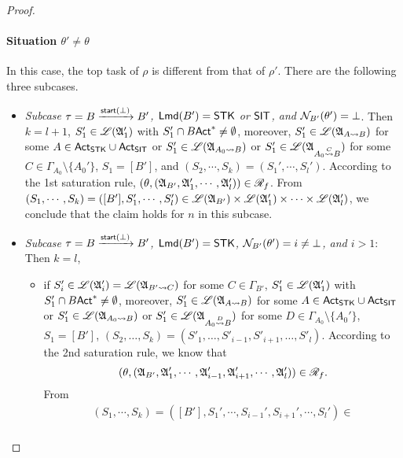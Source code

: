 \begin{proof}
{    \paragraph{Situation $\theta' \neq \theta$}
    In this case, the top task of $\rho$ is different from that of $\rho'$.  There are the following three subcases. 
    \begin{itemize}
        \item \emph{Subcase $\tau = B \xrightarrow{\startactivity(\bot)} B'$, $\lmd(B') = \STK$ or $\SIT$, and $\namefun_{B'}(\theta') = \bot$}. Then $k=l+1$, 
        $S_1'\in\Lang(\Aut_1')$ with $S_1'\cap B\act^*\neq\emptyset$, moreover,
        $S_1' \in \Lang(\Aut_{A\rightsquigarrow B})$ for some $A\in\act_{\STK}\cup\act_{\SIT}$ or $S_1'\in\Lang(\Aut_{A_0\rightsquigarrow B})$ or $S_1'\in\Lang(\Aut_{A_0\stackrel{C}\rightsquigarrow B})$ for some $C\in\Gamma_{A_0}\setminus\{A_0'\}$, 
        $S_1=[B']$, and $(S_2,\cdots,S_k)=(S_1',\cdots,S_l')$.  According to the 1st saturation rule, $(\theta, (\Aut_{B'}, \Aut_1', \cdots, \Aut_l')) \in \AutReach_f$.
       From $(S_1, \cdots, S_k) = ([B'], S_1', \cdots, S_l') \in \Lang(\Aut_{B'}) \times \Lang(\Aut_1') \times \cdots \times \Lang(\Aut_l')$, we conclude that the claim holds for $n$ in this subcase.
        \item \emph{Subcase $\tau = B \xrightarrow{\startactivity(\bot)} B'$, $\lmd(B')=\STK$, $\namefun_{B'}(\theta') = i \neq \bot$, and $i > 1$}: Then $k = l$, 
        \begin{itemize}
            \item if $S_i'\in\Lang(\Aut_i') = \Lang(\Aut_{B'\rightsquigarrow C})$ for some $C\in\Gamma_{B'}$, 
            $S_1'\in\Lang(\Aut_1')$ with $S_1'\cap B\act^*\neq \emptyset$, moreover,
            $S_1' \in \Lang(\Aut_{A\rightsquigarrow B})$ for some $A\in\act_{\STK}\cup\act_{\SIT}$ or $S_1'\in\Lang(\Aut_{A_0\rightsquigarrow B})$ or $S_1'\in\Lang(\Aut_{A_0\stackrel{D}\rightsquigarrow B})$ for some $D\in\Gamma_{A_0}\setminus\{A_0'\}$, 
            $S_1 = [B']$, $(S_2, \dots, S_k) = (S'_1, \dots, S'_{i-1}, S'_{i+1}, \dots, S'_l)$. According to the 2nd saturation rule, we know that 
            $$(\theta, (\Aut_{B'}, \Aut_1',\cdots, \Aut_{i-1}', \Aut_{i+1}', \cdots, \Aut_{l}')) \in \AutReach_f.$$
            From 
            $$
            \begin{array}{l}
                (S_1,\cdots,S_k) = ([B'], S_1', \cdots, S_{i-1}', S_{i+1}', \cdots, S_l') \in \\

\end{array}$$
\end{itemize}
\end{itemize}}
\end{proof}
